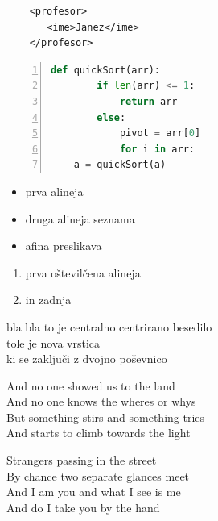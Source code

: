\documentclass[a4paper, 10pt]{article}
\begin{document}
\begin{verbatim}
    <profesor>
       <ime>Janez</ime>
    </profesor>
\end{verbatim}

\begin{lstlisting}[language=Python,numbers=left,escapechar=|]
    def quickSort(arr):
        if len(arr) <= 1:
            return arr
        else:
            pivot = arr[0]
            for i in arr:
    a = quickSort(a)
\end{lstlisting}

\begin{itemize}
    \item prva alineja
    \item druga  alineja seznama
    \item afina preslikava
\end{itemize}

\begin{enumerate}
    \item prva oštevilčena alineja
    \item in zadnja 
\end{enumerate}

\begin{center}
    bla bla to je centralno centrirano besedilo\\
    tole je nova vrstica\\
    ki se zaključi z dvojno poševnico
\end{center}

\begin{flushleft}
And no one showed us to the land\\
And no one knows the wheres or whys\\
But something stirs and something tries\\
And starts to climb towards the light
\end{flushleft}

\begin{flushright}
Strangers passing in the street\\
By chance two separate glances meet\\
And I am you and what I see is me\\
And do I take you by the hand\\
\end{flushright}
\end{document}
